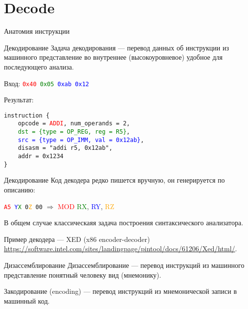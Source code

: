 \documentclass{beamer}
\begin{document}
\section{Decode}

\begin{frame}{Анатомия инструкции}
\centering

\end{frame}

\begin{frame}{Декодирование}
Задача декодирования — перевод данных об инструкции из машинного представление
во внутреннее (высокоуровневое) удобное для последующего анализа.

\pause

Вход: \texttt{\textcolor{red}{0x40} \textcolor{green}{0x05} \textcolor{blue}{0xab 0x12}}

Результат:

\texttt{instruction \{ \\
~~~~opcode = \textcolor{red}{ADDI}, num\_operands = 2, \\
~~~~\textcolor{green}{dst = \{type = OP\_REG, reg = R5\}}, \\
~~~~\textcolor{blue}{src = \{type = OP\_IMM, val = 0x12ab\}}, \\
~~~~disasm = "addi r5, 0x12ab", \\
~~~~addr = 0x1234 \\
\}}
\end{frame}

\begin{frame}{Декодирование}
Код декодера редко пишется вручную, он генерируется по описанию:

\texttt{\textcolor{red}{A5} \textcolor{blue}{Y}\textcolor{green}{X} 0\textcolor{orange}{Z} 00} $\Rightarrow$ \textcolor{red}{MOD} \textcolor{green}{RX}, \textcolor{blue}{RY}, \textcolor{orange}{RZ}

\pause\bigskip

В общем случае классическаяя задача построения  синтаксического анализатора.

\pause\bigskip

Пример декодера — XED (x86 encoder-decoder) \url{https://software.intel.com/sites/landingpage/pintool/docs/61206/Xed/html/}.
\end{frame}

\begin{frame}{Дизассемблирование}
Дизассемблирование — перевод инструкций из машинного представление понятный
человеку вид (мнемонику).

\pause\bigskip

Закодирование (encoding) — перевод инструкций из мнемонической записи в
машинный код.
\end{frame}
\end{document}
